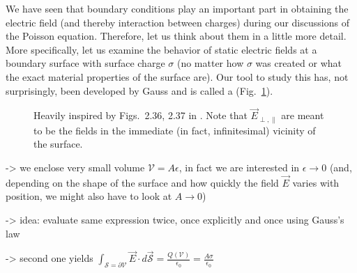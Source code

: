 \documentclass[../class_mech_main.tex]{subfiles}
\begin{document}
We have seen that boundary conditions play an important part in obtaining the electric field (and thereby interaction between charges) during our discussions of the Poisson equation. Therefore, let us think about them in a little more detail. More specifically, let us examine the behavior of static electric fields at a boundary surface with surface charge $\sigma$ (no matter how $\sigma$ was created or what the exact material properties of the surface are). Our tool to study this has, not surprisingly, been developed by Gauss and is called a  (Fig.~\ref{fig:gaussian_pillow}).



\begin{figure}
    \centering

    \hspace*{0.1\textwidth}%

    \caption{Heavily inspired by Figs.~2.36, 2.37 in \cite{Griffiths_2017}. Note that $\vec{E}_{\perp, \parallel}$ are meant to be the fields in the immediate (in fact, infinitesimal) vicinity of the surface.}
    \label{fig:gaussian_pillow}
\end{figure}




-> we enclose very small volume $\mathcal{V} = A \epsilon$, in fact we are interested in $\epsilon \rightarrow 0$ (and, depending on the shape of the surface and how quickly the field $\vec{E}$ varies with position, we might also have to look at $A \rightarrow 0$)

-> idea: evaluate same expression twice, once explicitly and once using Gauss's law

-> second one yields $\int_{\mathcal{S} = \partial \mathcal{V}} \vec{E} \cdot d\vec{\mathcal{S}} = \frac{Q(\mathcal{V})}{\epsilon_0} = \frac{A \sigma}{\epsilon_0}$
\end{document}
